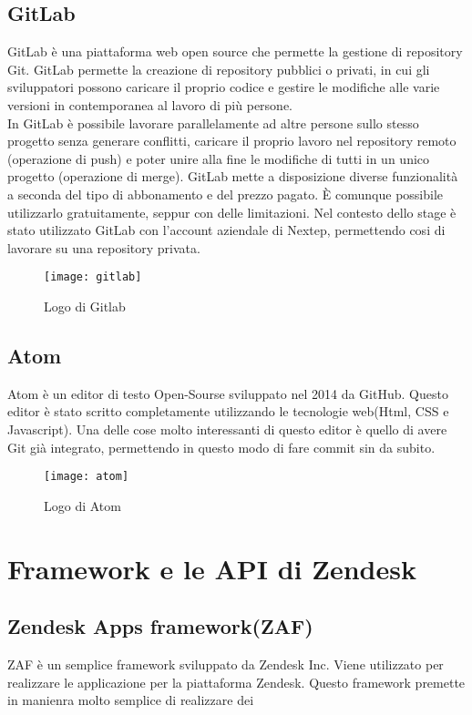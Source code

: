 \subsection{GitLab}GitLab è una piattaforma web open source che permette la gestione di repository Git. GitLab permette la creazione di repository pubblici o privati, in cui gli sviluppatori possono caricare il proprio codice e gestire le modifiche alle varie versioni in contemporanea al lavoro di più persone. 
\\

In GitLab è possibile lavorare parallelamente ad altre persone sullo stesso progetto senza generare conflitti, caricare il proprio lavoro nel repository remoto (operazione di push) e poter unire alla fine le modifiche di tutti in un unico progetto (operazione di merge). GitLab mette a disposizione diverse funzionalità a seconda del tipo di abbonamento e del prezzo pagato. È comunque possibile utilizzarlo gratuitamente, seppur con delle limitazioni. Nel contesto dello stage è stato utilizzato GitLab con l'account aziendale di Nextep, permettendo cosi di lavorare su una repository privata. 
\begin{figure}[!h] 
	\centering 
	\texttt{[image: gitlab]}
	\caption{Logo di Gitlab}
\end{figure}
\subsection{Atom}
Atom è un editor di testo Open-Sourse sviluppato nel 2014 da GitHub. Questo editor è stato scritto completamente utilizzando le tecnologie web(Html, CSS e Javascript). 
Una delle cose molto interessanti di questo editor è quello di avere Git già integrato, permettendo in questo modo di fare commit sin da subito. 
\begin{figure}[!h] 
	\centering 
	\texttt{[image: atom]}
	\caption{Logo di Atom}
\end{figure}

\section{Framework e le API di Zendesk}

\subsection{Zendesk Apps framework(ZAF)}
ZAF è un semplice framework sviluppato da Zendesk Inc. Viene utilizzato per realizzare le applicazione per la piattaforma Zendesk. Questo framework premette in manienra molto semplice di realizzare dei



